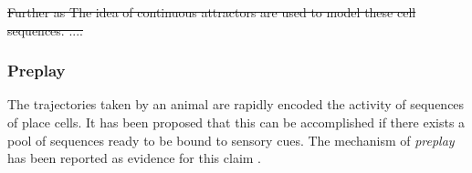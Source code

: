 \st{
Further as 
The idea of continuous attractors are used to model these cell sequences.   ....
}

\subsubsection{Preplay}
The trajectories taken by an animal are rapidly encoded the activity of sequences of place cells. It has been proposed that this can be accomplished if there exists a pool of sequences ready to be bound to sensory cues. The mechanism of \emph{preplay} has been reported as evidence for this claim  \cite{Dragoi2011, Dragoi2013a}. 

